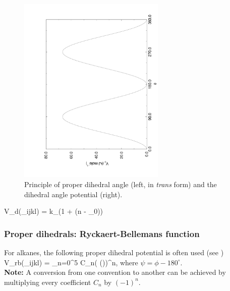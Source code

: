 \begin{figure}
\centerline{\includegraphics[angle=270,width=7cm]{plots/f_dih}}
\caption[Proper dihedral angle.]{Principle of proper dihedral angle
(left, in {\em trans} form) and the dihedral angle potential (right).} 
\label{fig:pdihf}
\end{figure}

\beq
V_d(\phi_{ijkl}) = k_{\phi}(1 + \cos(n \phi - \phi_0))
\eeq

\subsubsection{Proper dihedrals: Ryckaert-Bellemans function}
For alkanes, the following proper dihedral potential is often used
(see )
\beq
V_{rb}(\phi_{ijkl}) = \sum_{n=0}^5 C_n( \cos(\psi ))^n,
\eeq 
where $\psi = \phi - 180^\circ$.  \\
{\bf Note:} A conversion from one convention to another can be achieved by 
multiplying every coefficient \( \displaystyle C_n \) 
by \( \displaystyle (-1)^n \).

